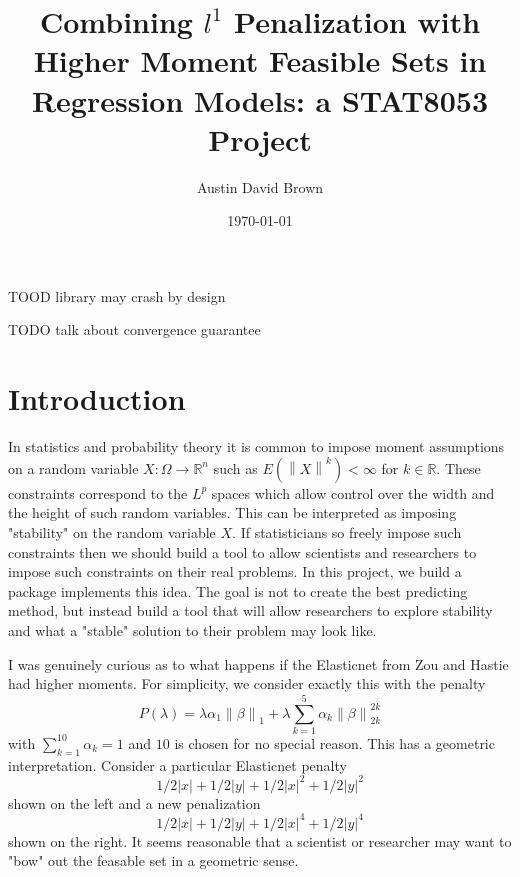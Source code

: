 \documentclass[12pt, a4paper, reqno]{article}
\newcommand{\forceindent}{\leavevmode{\parindent=1em\indent}}
\numberwithin{equation}{section}
\newcommand{\norm}[1]{\left\lVert#1\right\rVert}
\newcommand{\R}{\mathbb{R}}
\begin{document}
\title{Combining $l^1$ Penalization with Higher Moment Feasible Sets in Regression Models: a STAT8053 Project}
\author{Austin David Brown}
\date{\today}
\maketitle


TOOD library may crash by design

TODO talk about convergence guarantee

\section{Introduction}

In statistics and probability theory it is common to impose moment assumptions on a random variable $X : \Omega \to \R^n$ such as $E(\norm{X}^k) < \infty$ for $k \in \R$.
These constraints correspond to the $L^p$ spaces which allow control over the width and the height of such random variables.
This can be interpreted as imposing "stability" on the random variable $X$.
If statisticians so freely impose such constraints then we should build a tool to allow scientists and researchers to impose such constraints on their real problems.
In this project, we build a package implements this idea.
The goal is not to create the best predicting method, but instead build a tool that will allow researchers to explore stability and what a "stable" solution to their problem may look like.

\forceindent I was genuinely curious as to what happens if the Elasticnet from Zou and Hastie \cite{elasticnet} had higher moments.
For simplicity, we consider exactly this with the penalty
\[
P(\lambda) = \lambda \alpha_1 \norm{\beta}_1 + \lambda \sum_{k = 1}^{5} \alpha_k \norm{\beta}_{2k}^{2k} 
\]
with $\sum_{k = 1}^{10} \alpha_k = 1$ and $10$ is chosen for no special reason.
This has a geometric interpretation.
Consider a particular Elasticnet penalty 
\[
1/2 |x| + 1/2 |y| + 1/2|x|^2 + 1/2|y|^2
\]
 shown on the left and a new penalization 
 \[
 1/2|x| + 1/2|y| + 1/2|x|^4 + 1/2|y|^4
 \] shown on the right.
It seems reasonable that a scientist or researcher may want to "bow" out the feasable set in a geometric sense.
\end{document}
